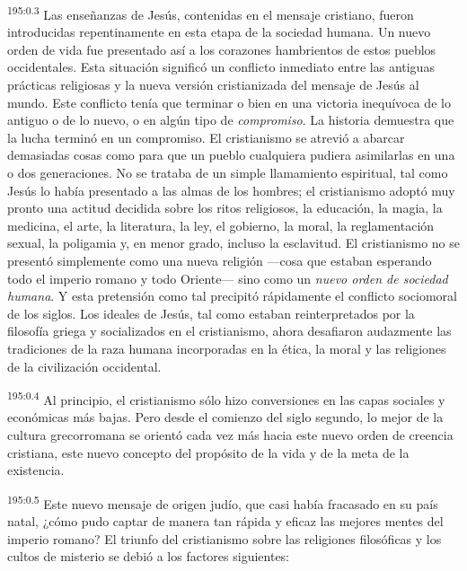 \par
\textsuperscript{195:0.3} Las enseñanzas de Jesús, contenidas en el mensaje cristiano, fueron introducidas repentinamente en esta etapa de la sociedad humana. Un nuevo orden de vida fue presentado así a los corazones hambrientos de estos pueblos occidentales. Esta situación significó un conflicto inmediato entre las antiguas prácticas religiosas y la nueva versión cristianizada del mensaje de Jesús al mundo. Este conflicto tenía que terminar o bien en una victoria inequívoca de lo antiguo o de lo nuevo, o en algún tipo de \textit{compromiso}. La historia demuestra que la lucha terminó en un compromiso. El cristianismo se atrevió a abarcar demasiadas cosas como para que un pueblo cualquiera pudiera asimilarlas en una o dos generaciones. No se trataba de un simple llamamiento espiritual, tal como Jesús lo había presentado a las almas de los hombres; el cristianismo adoptó muy pronto una actitud decidida sobre los ritos religiosos, la educación, la magia, la medicina, el arte, la literatura, la ley, el gobierno, la moral, la reglamentación sexual, la poligamia y, en menor grado, incluso la esclavitud. El cristianismo no se presentó simplemente como una nueva religión ---cosa que estaban esperando todo el imperio romano y todo Oriente--- sino como un \textit{nuevo orden de sociedad humana}. Y esta pretensión como tal precipitó rápidamente el conflicto sociomoral de los siglos. Los ideales de Jesús, tal como estaban reinterpretados por la filosofía griega y socializados en el cristianismo, ahora desafiaron audazmente las tradiciones de la raza humana incorporadas en la ética, la moral y las religiones de la civilización occidental.

\par
\textsuperscript{195:0.4} Al principio, el cristianismo sólo hizo conversiones en las capas sociales y económicas más bajas. Pero desde el comienzo del siglo segundo, lo mejor de la cultura grecorromana se orientó cada vez más hacia este nuevo orden de creencia cristiana, este nuevo concepto del propósito de la vida y de la meta de la existencia.

\par
\textsuperscript{195:0.5} Este nuevo mensaje de origen judío, que casi había fracasado en su país natal, ¿cómo pudo captar de manera tan rápida y eficaz las mejores mentes del imperio romano? El triunfo del cristianismo sobre las religiones filosóficas y los cultos de misterio se debió a los factores siguientes:

